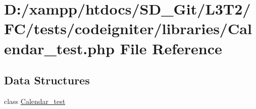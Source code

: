 \hypertarget{tests_2codeigniter_2libraries_2_calendar__test_8php}{}\section{D\+:/xampp/htdocs/\+S\+D\+\_\+\+Git/\+L3\+T2/\+F\+C/tests/codeigniter/libraries/\+Calendar\+\_\+test.php File Reference}
\label{tests_2codeigniter_2libraries_2_calendar__test_8php}
\subsection*{Data Structures}
\begin{DoxyCompactItemize}
\item 
class \hyperlink{class_calendar__test}{Calendar\+\_\+test}
\end{DoxyCompactItemize}
